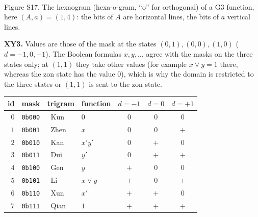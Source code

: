 \documentclass[10pt,a4paper]{article}
\begin{document}
\begin{center}\\[2pt]{\small Figure S17. The hexaogram (hexa-o-gram, ``o'' for orthogonal) of a G3 function, here $(A,a)=(1,4)$: the bits of $A$ are horizontal lines, the bits of $a$ vertical lines.}\end{center}

\textbf{XY3.} Values are those of the mask at the states $(0,1),(0,0),(1,0)$ ($d=-1,0,+1$). The Boolean formulas $x,y,\dots$ agree with the masks on the three states only; at $(1,1)$ they take other values (for example $x\vee y=1$ there, whereas the zon state has the value $0$), which is why the domain is restricted to the three states or $(1,1)$ is sent to the zon state.
\begin{center}\small\renewcommand{\arraystretch}{1.35}\begin{tabular}{rlllccc}\toprule id&mask&trigram&function&$d=-1$&$d=0$&$d=+1$\\\midrule
$0$&\texttt{0b000}&\tri{\yin}{\yin}{\yin} \ Kun&$0$&$0$&$0$&$0$\\
$1$&\texttt{0b001}&\tri{\yin}{\yin}{\yang} \ Zhen&$x$&$0$&$0$&$+$\\
$2$&\texttt{0b010}&\tri{\yin}{\yang}{\yin} \ Kan&$x'y'$&$0$&$+$&$0$\\
$3$&\texttt{0b011}&\tri{\yin}{\yang}{\yang} \ Dui&$y'$&$0$&$+$&$+$\\
$4$&\texttt{0b100}&\tri{\yang}{\yin}{\yin} \ Gen&$y$&$+$&$0$&$0$\\
$5$&\texttt{0b101}&\tri{\yang}{\yin}{\yang} \ Li&$x\vee y$&$+$&$0$&$+$\\
$6$&\texttt{0b110}&\tri{\yang}{\yang}{\yin} \ Xun&$x'$&$+$&$+$&$0$\\
$7$&\texttt{0b111}&\tri{\yang}{\yang}{\yang} \ Qian&$1$&$+$&$+$&$+$\\
\bottomrule\end{tabular}\end{center}
\end{document}
